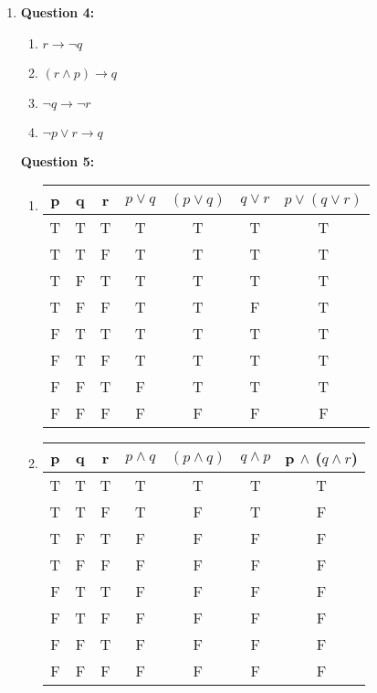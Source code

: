 \documentclass[11pt]{article}
\begin{document}
\begin{enumerate}
\item
\textbf{Question 4:}
\begin{enumerate}[label=(\alph*)]

\item
$r \rightarrow \neg q$

\item
$(r \wedge p) \rightarrow q$

\item
$\neg q \rightarrow \neg r$

\item 
$\neg p \vee r \rightarrow q $

\end{enumerate}
\textbf{Question 5:}
\begin{enumerate}[label=(\alph*)]

\item
\begin{tabular}{|c|c|c|c|c|c|c|}
\hline
p & q & r & $p \vee q$ & $(p \vee q)$ & $q \vee r$ & $p \vee (q \vee r)$\\
\hline
T & T & T & T & T & T & T\\
\hline
T & T & F & T & T & T & T\\
\hline
T & F & T & T & T & T & T\\
\hline
T & F & F & T & T & F & T\\
\hline
F & T & T & T & T & T & T\\
\hline
F & T & F & T & T & T & T\\
\hline
F & F & T & F & T & T & T\\
\hline
F & F & F & F & F & F & F\\
\hline
\end{tabular}

\item
\begin{tabular}{|c|c|c|c|c|c|c|}

\hline 
p & q & r & $p \wedge q$ & $(p \wedge q)$ & $q \wedge p$ & p $\wedge$ ($q \wedge r$)\\
\hline
T & T & T & T & T & T & T\\
\hline
T & T & F & T & F & T & F\\
\hline
T & F & T & F & F & F & F\\
\hline
T & F & F & F & F & F & F\\
\hline
F & T & T & F & F & F & F\\
\hline
F & T & F & F & F & F & F\\
\hline
F & F & T & F & F & F & F\\
\hline
F & F & F & F & F & F & F\\
\hline


\end{tabular}
\end{enumerate}
\end{enumerate}
\end{document}
